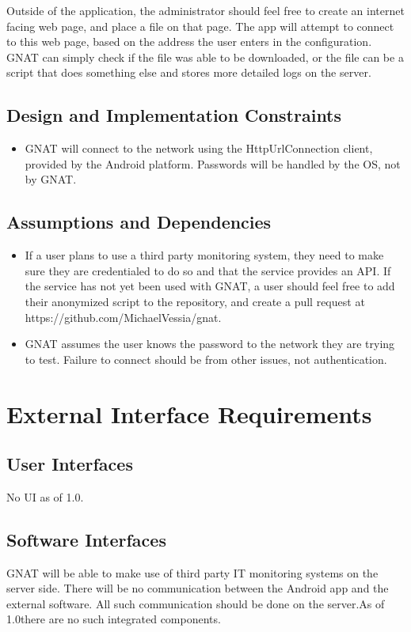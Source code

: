 \documentclass{scrreprt}
\def\version{1.0}
\def\sourcecode{https://github.com/MichaelVessia/gnat}
\begin{document}
Outside of the application, the administrator should feel free to create an internet facing web page, and place a file on that page.  The app will attempt to connect to this web page, based on the address the user enters in the configuration. GNAT can simply check if the file was able to be downloaded, or the file can be a script that does something else and stores more detailed logs on the server.

\section{Design and Implementation Constraints}

\begin{itemize}
\item GNAT will connect to the network using the HttpUrlConnection client, provided by the Android platform. Passwords will be handled by the OS, not by GNAT\@.
\end{itemize}

\section{Assumptions and Dependencies}

\begin{itemize}
\item If a user plans to use a third party monitoring system, they need to make sure they are credentialed to do so and that the service provides an API\@. If the service has not yet been used with GNAT, a user should feel free to add their anonymized script to the repository, and create a pull request at \sourcecode.
\item GNAT assumes the user knows the password to the network they are trying to test.  Failure to connect should be from other issues, not authentication.
\end{itemize}

\chapter{External Interface Requirements}

\section{User Interfaces}

No UI as of \version.

\section{Software Interfaces}
GNAT will be able to make use of third party IT monitoring systems on the server side.  There will be no communication between the Android app and the external software. All such communication should be done on the server.As of \version there are no such integrated components.
\end{document}
